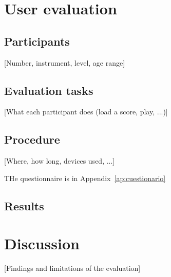
\section{User evaluation}

\subsection{Participants}

[Number, instrument, level, age range]

\subsection{Evaluation tasks}

[What each participant does (load a score, play, ...)]

\subsection{Procedure}

[Where, how long, devices used, ...]

THe questionnaire is in Appendix~\ref{ap:cuestionario}

\subsection{Results}

\section{Discussion}

[Findings and limitations of the evaluation]
